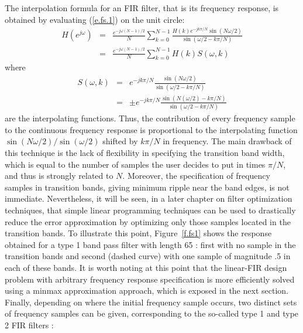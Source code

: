 	The interpolation formula for an FIR filter, that is its frequency response, is obtained by evaluating (\ref{e.fs.1}) on the unit circle:
\begin{eqnarray}
H(e^{j\omega}) &=& \frac{e^{-j\omega(N-1)/2}}{N}\sum_{k=0}^{N-1}\frac{H(k)e^{-jk\pi/N}\sin(N\omega/2)}{\sin(\omega/2-k\pi/N)}\nonumber\\
&=& \frac{e^{-j\omega(N-1)/2}}{N}\sum_{k=0}^{N-1}H(k)S(\omega,k)
\end{eqnarray}
where
\begin{eqnarray}
S(\omega,k) &=& e^{-jk\pi/N}\frac{\sin(N\omega/2)}{\sin(\omega/2-k\pi/N)}\nonumber\\
&=&\pm e^{-jk\pi/N}\frac{\sin(N(\omega/2)-k\pi/N)}{\sin(\omega/2-k\pi/N)}
\end{eqnarray}
are the interpolating functions.
Thus, the contribution of every frequency sample to the continuous
frequency response is proportional to the interpolating function
$\sin(N\omega/2)/\sin(\omega/2)$
shifted by \(k\pi/N\) in frequency.
	The main drawback of this technique is the lack of flexibility
in specifying the transition band width, which is equal to the number of samples the user decides to put in times \(\pi/N\), and thus is 
strongly related to $N$.
Moreover, the specification of frequency samples in transition bands, giving minimum ripple near the band edges, is not immediate.
Nevertheless, it will be seen, in a later chapter on filter optimization
techniques, that simple linear programming techniques can be used to drastically reduce the error approximation by optimizing only those samples located in the transition bands. To illustrate this point, Figure~\ref{f.fs1} shows the response obtained for a type 1 band pass filter with length 65 : 
first with no sample in the transition bands and second (dashed curve) with one sample 
of magnitude .5 in each of these bands. It is worth noting at this point 
that the linear-FIR design problem with arbitrary frequency response 
specification is more efficiently solved using a minmax approximation 
approach, which is exposed in the next section. \\

Finally, depending on where the initial frequency sample occurs, two distinct sets of frequency samples can be given, corresponding to the so-called
 type 1 and type 2 FIR filters :\\

